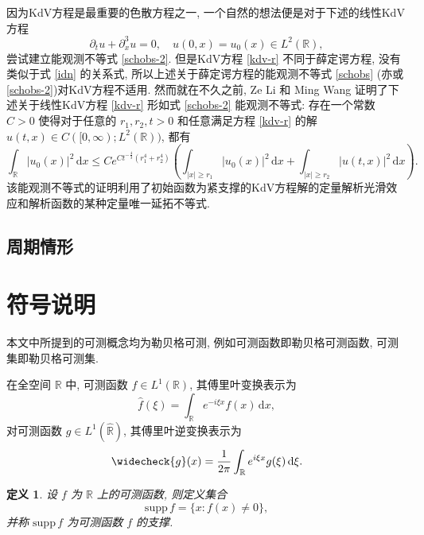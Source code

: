 \documentclass[master]{cugthesis}
\newcommand\R{\ensuremath{\mathbb{R}}}
\newcommand\Z{\ensuremath{\mathbb{Z}}}
\newcommand\T{\ensuremath{\mathbb{T}}}
\renewcommand\d{\ensuremath{\,\mathrm{d}}}
\newtheorem{definition}{定义}[chapter]
\begin{document}
    因为KdV方程是最重要的色散方程之一, 一个自然的想法便是对于下述的线性KdV方程
    \begin{equation}
        \partial_t u+\partial_x^3 u=0,\quad u(0,x)=u_0(x)\in L^2(\R),\label{kdv-r}
    \end{equation} 
    尝试建立能观测不等式 \eqref{schobs-2}. 但是KdV方程 \eqref{kdv-r} 不同于薛定谔方程, 没有类似于式 \eqref{idn} 的关系式, 所以上述关于薛定谔方程的能观测不等式 \eqref{schobs} (亦或 \eqref{schobs-2})对KdV方程不适用. 然而就在不久之前, Ze Li 和 Ming Wang 证明了下述关于线性KdV方程 \eqref{kdv-r} 形如式 \eqref{schobs-2} 能观测不等式: 存在一个常数 $C>0$ 使得对于任意的 $r_1,r_2,t>0$ 和任意满足方程 \eqref{kdv-r} 的解 $u(t,x)\in C([0,\infty);L^2(\R))$, 都有
    \begin{equation}
        \int_{\R}|u_0(x)|^2\d x\le Ce^{Ct^{-\frac{4}{3}}\left(r_1^4+r_2^4\right)}\left(\int
        _{|x|\ge r_1}|u_0(x)|^2\d x+\int _{|x|\ge r_2}|u(t,x)|^2\d x\right).\label{kdvobs-1}
    \end{equation}
    该能观测不等式的证明利用了初始函数为紧支撑的KdV方程解的定量解析光滑效应和解析函数的某种定量唯一延拓不等式.
   
    \subsection{周期情形}
    


    
    

    \iffalse 论文的第二部分考虑圆周 $\T:= \R / \Z$ 上的线性KdV方程.\cite{Ionescu2006UniquenessPO}
    \fi
    
    
    \section{符号说明}
    
    本文中所提到的可测概念均为勒贝格可测, 例如可测函数即勒贝格可测函数, 可测集即勒贝格可测集. 
    
    在全空间 $\R$ 中, 可测函数 $f\in L^1(\R)$, 其傅里叶变换表示为
    \begin{equation*}
        \widehat{f}(\xi)=\int_{\R} e^{-i\xi x} f(x)\d x,
    \end{equation*}
    对可测函数 $g\in L^1(\widehat{\R}) $, 其傅里叶逆变换表示为
    \begin{equation*}
        \widecheck{g}(x)=\frac{1}{2\pi}\int_{\R} e^{i\xi x} g(\xi) \d \xi.
    \end{equation*}
    
    \begin{definition}
    设 $f$ 为 $\R$ 上的可测函数, 则定义集合
    \begin{equation*}
        \mathrm{supp}\, f= \lbrace x: f(x)\neq 0 \rbrace,
    \end{equation*}
    并称 $\mathrm{supp}\, f$ 为可测函数 $f$ 的支撑.
    \end{definition}
    
\end{document}
